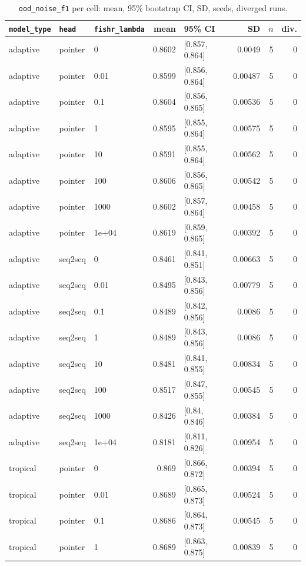 \documentclass[10pt]{article}
\begin{document}
{\small
\begin{longtable}{lllrlrrr}
\caption{\texttt{ood\_noise\_f1} per cell: mean, 95\% bootstrap CI, SD, seeds, diverged runs.}\label{tab:summary-ood_noise_f1}\\
\toprule
\texttt{model\_type} & \texttt{head} & \texttt{fishr\_lambda} & mean & 95\% CI & SD & $n$ & div.\\
\midrule
\endhead
adaptive & pointer & 0 & 0.8602 & [0.857, 0.864] & 0.0049 & 5 & 0\\
adaptive & pointer & 0.01 & 0.8599 & [0.856, 0.864] & 0.00487 & 5 & 0\\
adaptive & pointer & 0.1 & 0.8604 & [0.856, 0.865] & 0.00536 & 5 & 0\\
adaptive & pointer & 1 & 0.8595 & [0.855, 0.864] & 0.00575 & 5 & 0\\
adaptive & pointer & 10 & 0.8591 & [0.855, 0.864] & 0.00562 & 5 & 0\\
adaptive & pointer & 100 & 0.8606 & [0.856, 0.865] & 0.00542 & 5 & 0\\
adaptive & pointer & 1000 & 0.8602 & [0.857, 0.864] & 0.00458 & 5 & 0\\
adaptive & pointer & 1e+04 & 0.8619 & [0.859, 0.865] & 0.00392 & 5 & 0\\
adaptive & seq2seq & 0 & 0.8461 & [0.841, 0.851] & 0.00663 & 5 & 0\\
adaptive & seq2seq & 0.01 & 0.8495 & [0.843, 0.856] & 0.00779 & 5 & 0\\
adaptive & seq2seq & 0.1 & 0.8489 & [0.842, 0.856] & 0.0086 & 5 & 0\\
adaptive & seq2seq & 1 & 0.8489 & [0.843, 0.856] & 0.0086 & 5 & 0\\
adaptive & seq2seq & 10 & 0.8481 & [0.841, 0.855] & 0.00834 & 5 & 0\\
adaptive & seq2seq & 100 & 0.8517 & [0.847, 0.855] & 0.00545 & 5 & 0\\
adaptive & seq2seq & 1000 & 0.8426 & [0.84, 0.846] & 0.00384 & 5 & 0\\
adaptive & seq2seq & 1e+04 & 0.8181 & [0.811, 0.826] & 0.00954 & 5 & 0\\
tropical & pointer & 0 & 0.869 & [0.866, 0.872] & 0.00394 & 5 & 0\\
tropical & pointer & 0.01 & 0.8689 & [0.865, 0.873] & 0.00524 & 5 & 0\\
tropical & pointer & 0.1 & 0.8686 & [0.864, 0.873] & 0.00545 & 5 & 0\\
tropical & pointer & 1 & 0.8689 & [0.863, 0.875] & 0.00839 & 5 & 0\\

\end{longtable}}
\end{document}
